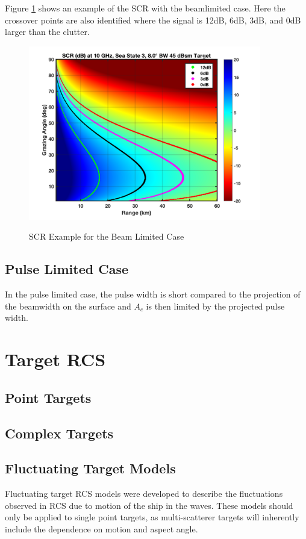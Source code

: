 Figure \ref{env_fig:3z} shows an example of the SCR with the beamlimited case. Here the crossover points are also identified where the signal is 12dB, 6dB, 3dB, and 0dB larger than the clutter.
\begin{figure}[H]
  \begin{center}
\includegraphics[width=4in]{../media/multistatic/scr.png}
  \end{center}
  \renewcommand{\baselinestretch}{1} \small\normalsize
  \begin{quote}
    \caption[SCR Example for the Beam Limited Case]{SCR Example for the Beam Limited Case\label{env_fig:3z}}
  \end{quote}
\end{figure}
\renewcommand{\baselinestretch}{2} \small\normalsize

\subsection{Pulse Limited Case}
In the pulse limited case, the pulse width is short compared to the projection of the beamwidth on the surface and $A_c$ is then limited by the projected pulse width.

\section{Target RCS}
\subsection{Point Targets}
\subsection{Complex Targets}
\subsection{Fluctuating Target Models}
Fluctuating target RCS models were developed to describe the fluctuations observed in RCS due to motion of the ship in the waves. These models should only be applied to single point targets, as multi-scatterer targets will inherently include the dependence on motion and aspect angle.

